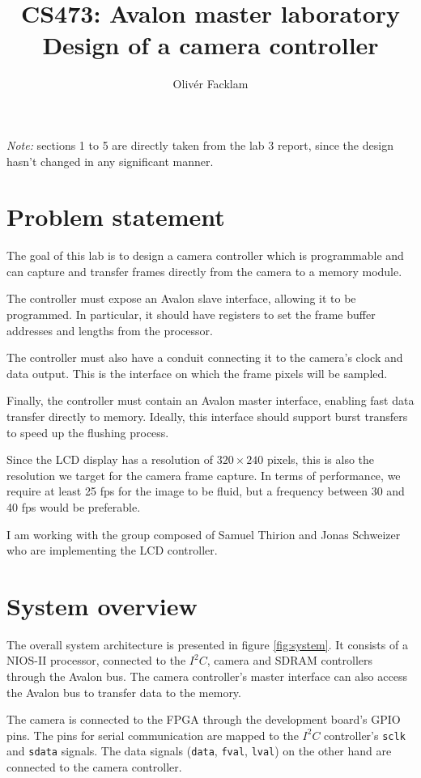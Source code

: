 \documentclass[12pt,a4paper]{article}
\author{Olivér Facklam}
\title{CS473: Avalon master laboratory\\Design of a camera controller}
\begin{document}
\maketitle
\tableofcontents

\bigskip
\textit{Note: } sections 1 to 5 are directly taken from the lab 3 report, since the design hasn't changed in any significant manner.

\section{Problem statement}

The goal of this lab is to design a camera controller which is programmable and can capture and transfer frames directly from the camera to a memory module.

The controller must expose an Avalon slave interface, allowing it to be programmed. In particular, it should have registers to set the frame buffer addresses and lengths from the processor.

The controller must also have a conduit connecting it to the camera's clock and data output. This is the interface on which the frame pixels will be sampled.

Finally, the controller must contain an Avalon master interface, enabling fast data transfer directly to memory. Ideally, this interface should support burst transfers to speed up the flushing process.

Since the LCD display has a resolution of $320\times 240$ pixels, this is also the resolution we target for the camera frame capture. In terms of performance, we require at least 25 fps for the image to be fluid, but a frequency between 30 and 40 fps would be preferable.

\bigskip
I am working with the group composed of Samuel Thirion and Jonas Schweizer who are implementing the LCD controller.

\section{System overview}

The overall system architecture is presented in figure \ref{fig:system}. It consists of a NIOS-II processor, connected to the $I^2C$, camera and SDRAM controllers through the Avalon bus. The camera controller's master interface can also access the Avalon bus to transfer data to the memory.

The camera is connected to the FPGA through the development board's GPIO pins. The pins for serial communication are mapped to the $I^2C$ controller's \texttt{sclk} and \texttt{sdata} signals. The data signals (\texttt{data}, \texttt{fval}, \texttt{lval}) on the other hand are connected to the camera controller.
\end{document}
